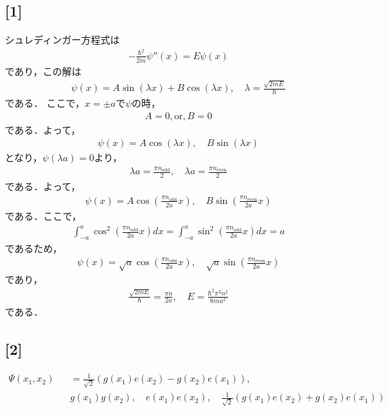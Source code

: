 \documentclass[12pt,dvipdfmx]{jsarticle}
\begin{document}
\subsection*{\large{[1]}}

シュレディンガー方程式は
\begin{eqnarray}
  -\frac{\hbar^2}{2m}\psi''(x) = E\psi(x)
\end{eqnarray}
であり，この解は
\begin{eqnarray}
  \psi(x) = A\sin(\lambda x) + B\cos(\lambda x),\quad \lambda = \frac{\sqrt{2mE}}{\hbar}
\end{eqnarray}
である．
ここで，$x=\pm a$で$\psi$の時，
\begin{eqnarray}
  A = 0 , \text{or} , B=0
\end{eqnarray}
である．よって，
\begin{eqnarray}
  \psi(x) = A\cos(\lambda x),\quad B\sin(\lambda x)
\end{eqnarray}
となり，$\psi(\lambda a)=0$より，
\begin{eqnarray}
  \lambda a = \frac{\pi n_{\text{odd}}}{2}, \quad \lambda a= \frac{\pi n_{\text{even}}}{2}
\end{eqnarray}
である．よって，
\begin{eqnarray}
  \psi(x) = A\cos\left( \frac{\pi n_{\text{odd}}}{2a} x \right), \quad B\sin\left( \frac{\pi n_{\text{even}}}{2a} x \right)
\end{eqnarray}
である．ここで，
\begin{eqnarray}
  \int_{-a}^{a} \cos^2\left( \frac{\pi n_{\text{odd}}}{2a} x \right)dx = \int_{-a}^{a} \sin^2\left( \frac{\pi n_{\text{odd}}}{2a} x \right)dx= a
\end{eqnarray}
であるため，
\begin{eqnarray}
  \psi(x) = \sqrt{a}\cos\left( \frac{\pi n_{\text{odd}}}{2a} x \right), \quad \sqrt{a}\sin\left( \frac{\pi n_{\text{even}}}{2a} x \right)
\end{eqnarray}
であり，
\begin{eqnarray}
  \frac{\sqrt{2mE}}{\hbar}= \frac{\pi n}{2a}, \quad E = \frac{\hbar^2 \pi^2 n^2}{8ma^2}
\end{eqnarray}
である．
\subsection*{\large{[2]}}
\begin{eqnarray}
  \Psi(x_1,x_2) &&= \frac{1}{\sqrt{2}}\left( g(x_1)e(x_2)-g(x_2)e(x_1) \right),\\
  &&g(x_1)g(x_2), \quad e(x_1)e(x_2), \quad \frac{1}{\sqrt{2}}\left( g(x_1)e(x_2)+g(x_2)e(x_1) \right)
\end{eqnarray}
\end{document}

